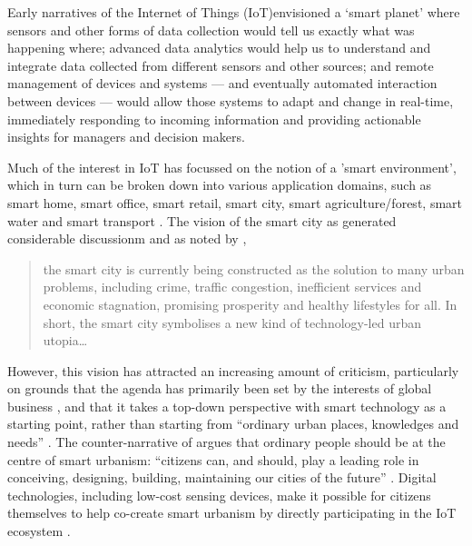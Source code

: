 Early narratives of the Internet of Things (IoT)envisioned a ‘smart planet’
where sensors and other forms of data
collection would tell us exactly what was happening where;
advanced data analytics would help us to understand and integrate data
collected from different sensors and other sources; and remote
management of devices and systems --- and eventually automated
interaction between devices --- would allow those systems to adapt and
change in real-time, immediately responding to incoming information
and providing actionable insights for managers and decision makers.  

Much of the interest in IoT has focussed on the notion of a 'smart
environment', which in turn can be broken down into various
application domains, such as smart home, smart office, smart retail,
smart city, smart agriculture/forest, smart water and smart transport \cite{Gubbi-2013-IOT}.
The vision of the smart city as generated considerable discussionm and
as noted by \cite{Hollands-2015-CIIT}, 

\begin{quote}
  the smart city is currently being constructed as the solution to
  many urban problems, including crime, traffic congestion, inefficient
  services and economic stagnation, promising prosperity and healthy
  lifestyles for all. In short, the smart city symbolises a new kind
  of technology-led urban utopia\ldots
\end{quote}

However, this vision has attracted an increasing amount of criticism,
particularly on grounds that the agenda has primarily been set by the
interests of global business \cite{Hollands-2015-CIIT}, and that it
takes a top-down perspective with smart technology as a starting
point, rather than starting from ``ordinary urban places, knowledges
and needs'' \cite{Mcfarlane-2017-OASC}. The counter-narrative of
 argues that ordinary people should be at the
centre of smart urbanism: ``citizens can, and should, play a leading
role in conceiving, designing, building, maintaining our cities of the
future'' \cite{Hemment-2013-SC,Hemment-2016-HTDU}.
Digital technologies, including low-cost sensing devices, make it
possible for citizens themselves to help co-create smart urbanism by
directly participating in the IoT ecosystem
\cite{Balestrini-2017-OCTT}.


